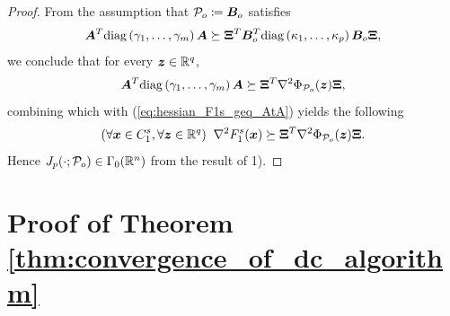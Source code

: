 \documentclass[lettersize,journal]{IEEEtran}
\theoremstyle{plain}%
\theoremstyle{definition}
\theoremstyle{remark}
\begin{document}
\begin{proof}
From the assumption that $\mathcal{P}_o\coloneqq\bm{B}_o$ satisfies
\begin{equation*}
\bm{A}^T\mathrm{diag}\left( \gamma_1,\dots,\gamma_m \right )\bm{A}\succeq\bm{\Xi}^T\bm{B}_o^T\mathrm{diag}\left( \kappa_1,\dots,\kappa_p \right )\bm{B}_o\bm{\Xi},
\end{equation*}
we conclude that for every $\bm{z}\in\mathbb{R}^q$,
\begin{equation*}
\bm{A}^T\mathrm{diag}\left( \gamma_1,\dots,\gamma_m \right )\bm{A}\succeq \bm{\Xi}^T\nabla^2\Phi_{\mathcal{P}_o}(\bm{z})\bm{\Xi},
\end{equation*}
combining which with (\ref{eq:hessian_F1s_geq_AtA}) yields the following
\begin{equation*}
(\forall\bm{x}\in C_1^s,\forall \bm{z}\in \mathbb{R}^q)\;\;\nabla^2 F_1^s(\bm{x})\succeq \bm{\Xi}^T\nabla^2\Phi_{\mathcal{P}_o}(\bm{z})\bm{\Xi}.
\end{equation*} 
Hence $J_{p}(\cdot;\mathcal{P}_o)\in\Gamma_0(\mathbb{R}^n)$ from the result of 1). 
\qedhere
\end{proof}


\section{Proof of Theorem \ref{thm:convergence_of_dc_algorithm}}
\label{app:convergence_of_DC_algorithm}
\end{document}
